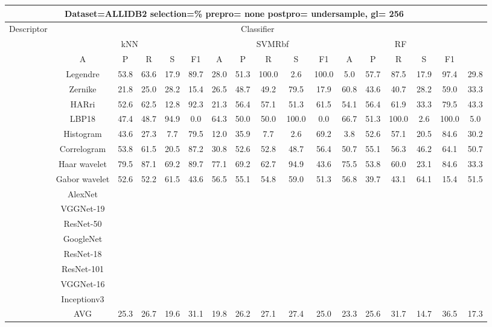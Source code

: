 \documentclass[12pt,italian]{article}
\begin{document}
\begin{tiny}
\begin{longtable}{lcccccccccccccccc}
\toprule
\multicolumn{16}{c}{Dataset=ALLIDB2 selection=\% prepro= none postpro= undersample, gl= 256} \\ 
\toprule
Descriptor & \multicolumn{15}{c}{Classifier} \\ 
& \multicolumn{5}{c}{kNN} & \multicolumn{5}{c}{SVMRbf} & \multicolumn{5}{c}{RF} \\ 
& A & P & R & S & F1 & A & P & R & S & F1 & A & P & R & S & F1 \\ 
\midrule
& Legendre & 53.8 & 63.6 & 17.9 & 89.7 & 28.0 & 51.3 & 100.0 &  2.6 & 100.0 &  5.0 & 57.7 & 87.5 & 17.9 & 97.4 & 29.8 \\ 
& Zernike & 21.8 & 25.0 & 28.2 & 15.4 & 26.5 & 48.7 & 49.2 & 79.5 & 17.9 & 60.8 & 43.6 & 40.7 & 28.2 & 59.0 & 33.3 \\ 
& HARri & 52.6 & 62.5 & 12.8 & 92.3 & 21.3 & 56.4 & 57.1 & 51.3 & 61.5 & 54.1 & 56.4 & 61.9 & 33.3 & 79.5 & 43.3 \\ 
& LBP18 & 47.4 & 48.7 & 94.9 &  0.0 & 64.3 & 50.0 & 50.0 & 100.0 &  0.0 & 66.7 & 51.3 & 100.0 &  2.6 & 100.0 &  5.0 \\ 
& Histogram & 43.6 & 27.3 &  7.7 & 79.5 & 12.0 & 35.9 &  7.7 &  2.6 & 69.2 &  3.8 & 52.6 & 57.1 & 20.5 & 84.6 & 30.2 \\ 
& Correlogram & 53.8 & 61.5 & 20.5 & 87.2 & 30.8 & 52.6 & 52.8 & 48.7 & 56.4 & 50.7 & 55.1 & 56.3 & 46.2 & 64.1 & 50.7 \\ 
& Haar wavelet & 79.5 & 87.1 & 69.2 & 89.7 & 77.1 & 69.2 & 62.7 & 94.9 & 43.6 & 75.5 & 53.8 & 60.0 & 23.1 & 84.6 & 33.3 \\ 
& Gabor wavelet & 52.6 & 52.2 & 61.5 & 43.6 & 56.5 & 55.1 & 54.8 & 59.0 & 51.3 & 56.8 & 39.7 & 43.1 & 64.1 & 15.4 & 51.5 \\ 
& AlexNet \\ 
& VGGNet-19 \\ 
& ResNet-50 \\ 
& GoogleNet \\ 
& ResNet-18 \\ 
& ResNet-101 \\ 
& VGGNet-16 \\ 
& Inceptionv3 \\ 
\hline
& AVG & 25.3 & 26.7 & 19.6 & 31.1 & 19.8 & 26.2 & 27.1 & 27.4 & 25.0 & 23.3 & 25.6 & 31.7 & 14.7 & 36.5 & 17.3 \\ 
\hline
\bottomrule
\end{longtable} 


\end{tiny}
\end{document}
